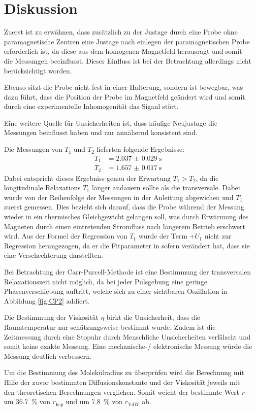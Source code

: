 \section{Diskussion}
\label{sec:Diskussion}


Zuerst ist zu erwähnen, dass zusätzlich zu der Justage durch eine Probe ohne
paramagnetische Zentren eine Justage nach einlegen der paramagnetischen Probe
erforderlich ist, da diese aus dem homogenen Magnetfeld herausragt und somit die
Messungen beeinflusst. Dieser Einfluss ist bei der Betrachtung allerdings nicht
berücksichtigt worden.

Ebenso sitzt die Probe nicht fest in einer Halterung, sondern ist bewegbar, was
dazu führt, dass die Position der Probe im Magnetfeld geändert wird und somit durch
eine experimentelle Inhomogenität das Signal stört.

Eine weitere Quelle für Unsicherheiten ist, dass häufige Neujustage die Messungen
beinflusst haben und nur annähernd konsistent sind.

Die Messungen von $T_1$ und $T_2$ lieferten folgende Ergebnisse:
\begin{align*}
  T_1 &= \SI{2.037(29)}{\second} \\
  T_2 &= \SI{1.657(17)}{\second}
\end{align*}
Dabei entspricht dieses Ergebniss genau der Erwartung $T_1 > T_2$, da die longitudinale
Relaxations $T_1$ länger andauern sollte als die transversale. Dabei wurde von der
Reihenfolge der Messungen in der Anleitung abgewichen und $T_1$ zuerst gemessen.
Dies bezieht sich darauf, dass die Probe während der Messung wieder in ein thermisches
Gleichgewicht gelangen soll, was durch Erwärmung des Magneten durch einen eintretenden
Stromfluss nach längerem Betrieb erschwert wird.
Aus der Formel der Regression von $T_1$ wurde der Term $+ U_1$ nicht zur Regression
herangezogen, da er die Fitparameter in sofern verändert hat, dass sie eine
Verschechterung darstellten.

Bei Betrachtung der Carr-Purcell-Methode ist eine Bestimmung der transversalen
Relaxationszeit nicht möglich, da bei jeder Pulsgebung eine geringe Phasenverschiebung
auftritt, welche sich zu einer sichtbaren Oszillation in Abbildung \ref{fig:CP2}
addiert.

Die Bestimmung der Viskosität $\eta$ birkt die Unsicherheit, dass die Raumtemperatur
nur schätzungsweise bestimmt wurde. Zudem ist die Zeitmessung durch eine Stopuhr durch
Menschliche Unsicherheiten verfälscht und somit keine exakte Messung. Eine mechanische-/
elektronische Messung würde die Messung deutlich verbessern.

Um die Bestimmung des Molekülradius zu überprüfen wird die Berechnung mit Hilfe der zuvor
bestimmten Diffusionskonstante und der Viskosität jeweils mit den theoretischen
Berechnungen verglichen.
Somit weicht der bestimmte Wert $r$ um \SI{36.7}{\percent} von $r_\text{hcp}$ und um
\SI{7.8}{\percent} von $r_\text{VdW}$ ab.
